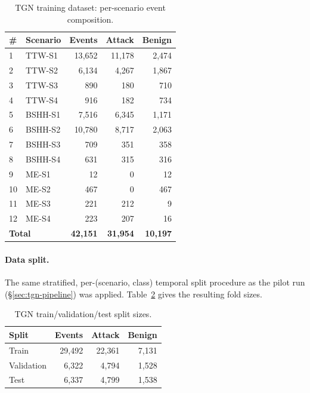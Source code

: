 \begin{table}[htbp]
\centering
\caption{TGN training dataset: per-scenario event composition.}
\label{tab:tgn-val2-dataset}
\begin{tabular}{@{}llrrr@{}}
\toprule
\# & Scenario & Events & Attack & Benign \\
\midrule
1  & TTW-S1  & 13{,}652 & 11{,}178 & 2{,}474 \\
2  & TTW-S2  & 6{,}134  & 4{,}267  & 1{,}867 \\
3  & TTW-S3  & 890      & 180      & 710     \\
4  & TTW-S4  & 916      & 182      & 734     \\
5  & BSHH-S1 & 7{,}516  & 6{,}345  & 1{,}171 \\
6  & BSHH-S2 & 10{,}780 & 8{,}717  & 2{,}063 \\
7  & BSHH-S3 & 709      & 351      & 358     \\
8  & BSHH-S4 & 631      & 315      & 316     \\
9  & ME-S1   & 12       & 0        & 12      \\
10 & ME-S2   & 467      & 0        & 467     \\
11 & ME-S3   & 221      & 212      & 9       \\
12 & ME-S4   & 223      & 207      & 16      \\
\midrule
\multicolumn{2}{l}{\textbf{Total}} & \textbf{42{,}151} & \textbf{31{,}954} & \textbf{10{,}197} \\
\bottomrule
\end{tabular}
\end{table}

\paragraph{Data split.}
The same stratified, per-(scenario, class) temporal split procedure as the
pilot run (\S\ref{sec:tgn-pipeline}) was applied. Table~\ref{tab:tgn-val2-split}
gives the resulting fold sizes.

\begin{table}[htbp]
\centering
\caption{TGN train/validation/test split sizes.}
\label{tab:tgn-val2-split}
\begin{tabular}{@{}lrrr@{}}
\toprule
Split & Events & Attack & Benign \\
\midrule
Train      & 29{,}492 & 22{,}361 & 7{,}131 \\
Validation & 6{,}322  & 4{,}794  & 1{,}528 \\
Test       & 6{,}337  & 4{,}799  & 1{,}538 \\
\bottomrule
\end{tabular}
\end{table}

